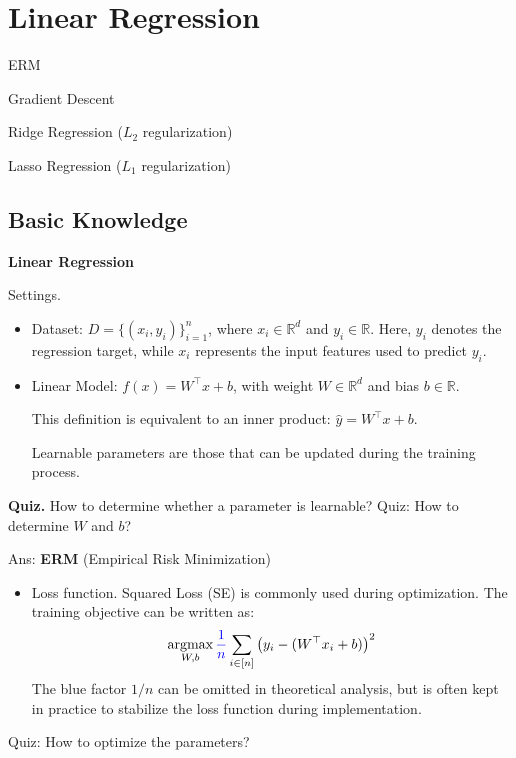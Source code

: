 \documentclass[../main]{subfiles}
\begin{document}
\chapter{Linear Regression}
\begin{introduction}
\item ERM
\item Gradient Descent
\item Ridge Regression ($L_2$ regularization)
\item Lasso Regression ($L_1$ regularization)
\end{introduction}
\section{Basic Knowledge}
\begin{example}
\textbf{Linear Regression}
\end{example}

{Settings.}
\begin{itemize}
  \item Dataset: $D=\{(x_i,y_i)\}_{i=1}^n$, where $x_i\in\mathbb{R}^d$ and $y_i\in\mathbb{R}$.  
  Here, $y_i$ denotes the regression target, while $x_i$ represents the input features used to predict $y_i$.

  \item Linear Model: $f(x)=W^{\top}x+b$, with weight $W\in\mathbb{R}^d$ and bias $b\in\mathbb{R}$.  
  \begin{note}
    This definition is equivalent to an inner product:  
    $\hat y = W^{\top}x+b.$
  \end{note}

  \begin{definition}
    Learnable parameters are those that can be updated during the training process.
  \end{definition}
\end{itemize}

\textbf{Quiz.} How to determine whether a parameter is learnable?
Quiz: How to determine $W$ and $b$?

\noindent Ans: \textbf{ERM} (Empirical Risk Minimization)

\begin{itemize}
  \item Loss function. Squared Loss (SE) is commonly used during optimization. The training objective can be written as:
  \begin{equation}
    \mathop{\text{argmax}}_{W,b}{\color{blue}{\frac{1}{n}}}\sum_{i\in[n]}\left(y_i-(W^\top x_i+b)\right)^2
  \end{equation}
  The blue factor $1/n$ can be omitted in theoretical analysis, but is often kept in practice to stabilize the loss function during implementation.
\end{itemize}
Quiz: How to optimize the parameters?
\end{document}
